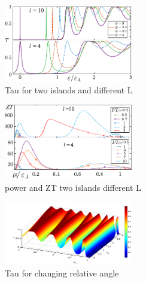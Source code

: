 \begin{figure}
    \centering
    \includegraphics[width = 0.5\textwidth]{figures/theory/fig4.pdf}
    \caption{Tau for two islands and different L}
    \label{fig:teo:tauDiffL}
\end{figure}

\begin{figure}
    \centering
    \includegraphics[width = 0.5\textwidth]{figures/theory/fig5.pdf}
    \caption{power and ZT two islands different L}
    \label{fig:teo:powerZTDiffL}
\end{figure}


\begin{figure}
    \centering
    \includegraphics[width = 0.5\textwidth]{figures/theory/Tauenerphi.png}
    \caption{Tau for changing relative angle}
    \label{fig:teo:tauDiffangle}
\end{figure}